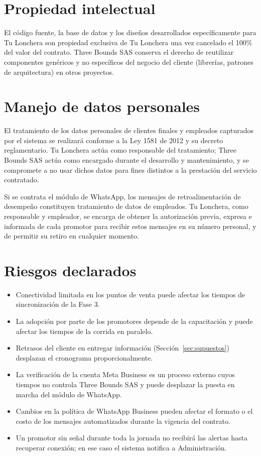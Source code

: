 \documentclass[11pt,a4paper]{article}
\begin{document}
\section{Propiedad intelectual}\label{sec:propiedad}
El código fuente, la base de datos y los diseños desarrollados específicamente para
Tu Lonchera son propiedad exclusiva de Tu Lonchera una vez cancelado el 100\% del
valor del contrato. Three Bounds SAS conserva el derecho de reutilizar componentes
genéricos y no específicos del negocio del cliente (librerías, patrones de
arquitectura) en otros proyectos.

\section{Manejo de datos personales}
El tratamiento de los datos personales de clientes finales y empleados capturados por
el sistema se realizará conforme a la Ley 1581 de 2012 y su decreto reglamentario.
Tu Lonchera actúa como responsable del tratamiento; Three Bounds SAS actúa como
encargado durante el desarrollo y mantenimiento, y se compromete a no usar dichos
datos para fines distintos a la prestación del servicio contratado.

Si se contrata el módulo de WhatsApp, los mensajes de retroalimentación de desempeño
constituyen tratamiento de datos de empleados. Tu Lonchera, como responsable y
empleador, se encarga de obtener la autorización previa, expresa e informada de cada
promotor para recibir estos mensajes en su número personal, y de permitir su retiro
en cualquier momento.

\section{Riesgos declarados}
\begin{itemize}
    \item Conectividad limitada en los puntos de venta puede afectar los tiempos de
    sincronización de la Fase 3.
    \item La adopción por parte de los promotores depende de la capacitación y puede
    afectar los tiempos de la corrida en paralelo.
    \item Retrasos del cliente en entregar información (Sección~\ref{sec:supuestos})
    desplazan el cronograma proporcionalmente.
    \item La verificación de la cuenta Meta Business es un proceso externo cuyos tiempos
    no controla Three Bounds SAS y puede desplazar la puesta en marcha del módulo de WhatsApp.
    \item Cambios en la política de WhatsApp Business pueden afectar el formato o el
    costo de los mensajes automatizados durante la vigencia del contrato.
    \item Un promotor sin señal durante toda la jornada no recibirá las alertas hasta
    recuperar conexión; en ese caso el sistema notifica a Administración.
\end{itemize}
\end{document}
